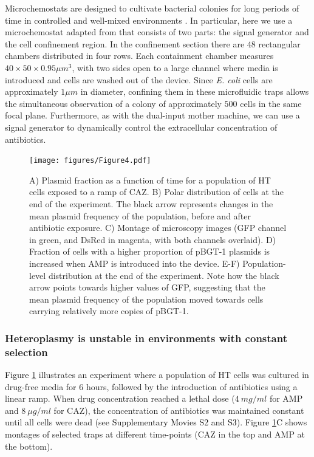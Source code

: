 \documentclass[fleqn,12pt]{wlscirep}
\newcommand{\fig}[1]{\textcolor{black}{#1}}
\begin{document}
Microchemostats are designed to cultivate bacterial colonies for long periods of time in controlled and well-mixed environments \cite{moffitt2012single,mondragon2011entrainment,lopatkin2016antibiotics,li2019dissecting}. In particular, here we use a microchemostat adapted from \cite{mondragon2011entrainment} that consists of two parts: the signal generator and the cell confinement region. In the confinement section there are $48$ rectangular chambers distributed in four rows. Each containment chamber measures $40 \times 50 \times 0.95 \mu m^3$, with two sides open to a large channel where media is introduced and cells are washed out of the device. Since {\em E. coli} cells are approximately $1 \mu m$ in diameter, confining them in these microfluidic traps allows the simultaneous observation of a colony of approximately $500$ cells in the same focal plane. Furthermore, as with the dual-input mother machine, we can use a signal generator to dynamically control the extracellular concentration of antibiotics.


\begin{figure}[ht!]
\centering
\texttt{[image: figures/Figure4.pdf]}
\caption{ \small{ A) Plasmid fraction as a function of time for a population of HT cells exposed to a ramp of CAZ.  B) Polar distribution of cells at the end of the experiment. The black arrow represents changes in the mean plasmid frequency of the population, before and after antibiotic exposure. C) Montage of microscopy images (GFP channel in green, and DsRed in magenta, with both channels overlaid).  D) Fraction of cells with a higher proportion of pBGT-1 plasmids is increased when AMP is introduced into the device. E-F) Population-level distribution at the end of the experiment.  Note how the black arrow points towards higher values of GFP, suggesting that the mean plasmid frequency of the population moved towards cells carrying relatively more copies of pBGT-1.}}
\label{fig:microchemostat}
\end{figure}

\subsubsection{Heteroplasmy is unstable in environments with constant selection} 

\fig{Figure \ref{fig:microchemostat}} illustrates an experiment where a population of HT cells was cultured in drug-free media for 6 hours, followed by the introduction of antibiotics using a linear ramp. When drug concentration reached a lethal dose ($4\ mg/ml$ for AMP and $8\ \mu g/ml$ for CAZ), the concentration of antibiotics was maintained constant until all cells were dead (see \fig{Supplementary Movies S2 and S3}).
\fig{Figure \ref{fig:microchemostat}C} shows montages of selected traps at different time-points (CAZ in the top and AMP at the bottom).  
\end{document}
